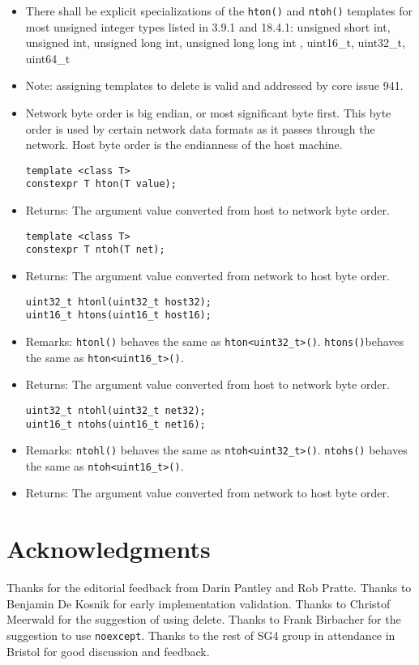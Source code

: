 \documentclass[12pt,twoside]{article}
\begin{document}
\begin{itemize}
    \item There shall be explicit specializations of the \texttt{hton()} and \texttt{ntoh()} templates for most unsigned integer types listed in 3.9.1 and 18.4.1: unsigned short int, unsigned int, unsigned long int, unsigned long long int
, uint16\_t, uint32\_t, uint64\_t
    \item  Note: assigning templates to delete is valid and addressed by core issue 941.
    \item Network byte order is big endian, or most significant byte first. This byte order is used by certain network data formats as it passes through the network. Host byte order is the endianness of the host machine.


\begin{lstlisting}
template <class T>
constexpr T hton(T value);
\end{lstlisting}
    \item Returns: The argument value converted from host to network byte order.


\begin{lstlisting}
template <class T>
constexpr T ntoh(T net);
\end{lstlisting}
    \item Returns: The argument value converted from network to host byte order.


\begin{lstlisting}
uint32_t htonl(uint32_t host32);
uint16_t htons(uint16_t host16);
\end{lstlisting}
    \item Remarks:  \texttt{htonl()} behaves the same as \texttt{hton<uint32\_t>()}.  \texttt{htons()}behaves the same as \texttt{hton<uint16\_t>()}.
    \item Returns: The argument value converted from host to network byte order.


\begin{lstlisting}
uint32_t ntohl(uint32_t net32);
uint16_t ntohs(uint16_t net16);
\end{lstlisting}
    \item Remarks: \texttt{ntohl()} behaves the same as \texttt{ntoh<uint32\_t>()}.  \texttt{ntohs()}
behaves the same as  \texttt{ntoh<uint16\_t>()}.
    \item Returns: The argument value converted from network to host byte order.
\end{itemize}

\section{Acknowledgments}
Thanks for the editorial feedback from Darin Pantley and Rob Pratte. Thanks to Benjamin De Kosnik for early implementation validation. Thanks to Christof Meerwald for the suggestion of using \= delete. Thanks to Frank Birbacher for the suggestion to use \texttt{noexcept}. Thanks to the rest of SG4 group in attendance in Bristol for good discussion and feedback.
\end{document}
